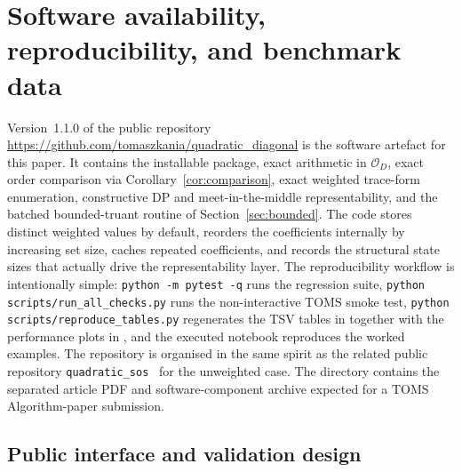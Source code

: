 \documentclass[manuscript]{acmart}
\theoremstyle{plain}
\theoremstyle{definition}
\theoremstyle{nonitalicremark}
\newcommand{\OO}{\mathcal{O}}
\newcommand{\OD}{\OO_D}
\begin{document}
\section{Software availability, reproducibility, and benchmark data}\label{sec:impl}

Version~1.1.0 of the public repository
\url{https://github.com/tomaszkania/quadratic_diagonal} is the software artefact for this paper. It contains the installable package, exact arithmetic in $\OD$,
exact order comparison via Corollary~\ref{cor:comparison}, exact weighted trace-form enumeration,
constructive DP and meet-in-the-middle representability, and the batched bounded-truant routine of
Section~\ref{sec:bounded}. The code stores distinct weighted values by default, reorders the
coefficients internally by increasing set size, caches repeated coefficients, and records the
structural state sizes that actually drive the representability layer. The reproducibility workflow
is intentionally simple: \texttt{python -m pytest -q} runs the regression suite,
\texttt{python scripts/run\_all\_checks.py} runs the non-interactive TOMS smoke test,
\texttt{python scripts/reproduce\_tables.py} regenerates the TSV tables in  together
with the performance plots in , and the executed notebook reproduces the
worked examples. The repository is organised in the same spirit as the related public repository
\texttt{quadratic\_sos}~\cite{KaniaQSOS} for the unweighted case. The 
directory contains the separated article PDF and software-component archive expected for a TOMS
Algorithm-paper submission.

\subsection*{Public interface and validation design}
\end{document}
